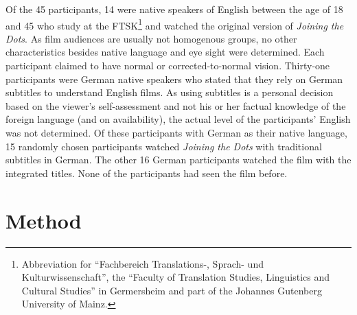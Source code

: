 \documentclass[output=paper]{langsci/langscibook}
\begin{document}
Of the 45 participants, 14 were native speakers of English between the age of 18 and 45 who study at the FTSK\footnote{Abbreviation for ``Fachbereich Translations-, Sprach- und Kulturwissenschaft'', the ``Faculty of Translation Studies, Linguistics and Cultural Studies'' in Germersheim and part of the Johannes Gutenberg University of Mainz.} and watched the original version of \textit{Joining the Dots}. As film audiences are usually not homogenous groups, no other characteristics besides native language and eye sight were determined. Each participant claimed to have normal or corrected-to-normal vision. Thirty-one participants were German native speakers who stated that they rely on German subtitles to understand English films. As using subtitles is a personal decision based on the viewer's self-assessment and not his or her factual knowledge of the foreign language (and on availability), the actual level of the participants' English was not determined. Of these participants with German as their native language, 15 randomly chosen participants watched \textit{Joining the Dots} with traditional subtitles in German. The other 16 German participants watched the film with the integrated titles. None of the participants had seen the film before.

\section{Method}
\end{document}
